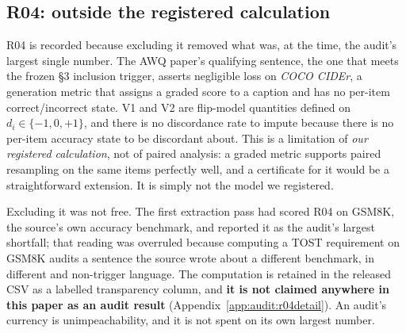 \subsection{R04: outside the registered calculation}
\label{sec:audit:r04}

R04 is recorded because excluding it removed what was, at the time, the audit's
largest single number. The AWQ paper's qualifying sentence, the one that meets
the frozen §3 inclusion trigger, asserts negligible loss on \emph{COCO
CIDEr}, a generation metric that assigns a graded score to a caption and has no
per-item correct/incorrect state. V1 and V2 are flip-model quantities defined on
$d_i \in \{-1,0,+1\}$, and there is no discordance rate to impute because there
is no per-item accuracy state to be discordant about. This is a limitation of
\emph{our registered calculation}, not of paired analysis: a graded metric
supports paired resampling on the same items perfectly well, and a certificate
for it would be a straightforward extension. It is simply not the model we
registered.

Excluding it was not free. The first extraction pass had scored R04 on GSM8K,
the source's own accuracy benchmark, and reported it as the audit's largest
shortfall; that reading was overruled because computing a TOST requirement on
GSM8K audits a sentence the source wrote about a different benchmark, in
different and non-trigger language. The computation is retained in the released
CSV as a labelled transparency column, and \textbf{it is not claimed anywhere in
this paper as an audit result} (Appendix~\ref{app:audit:r04detail}). An audit's
currency is unimpeachability, and it is not spent on its own largest number.

